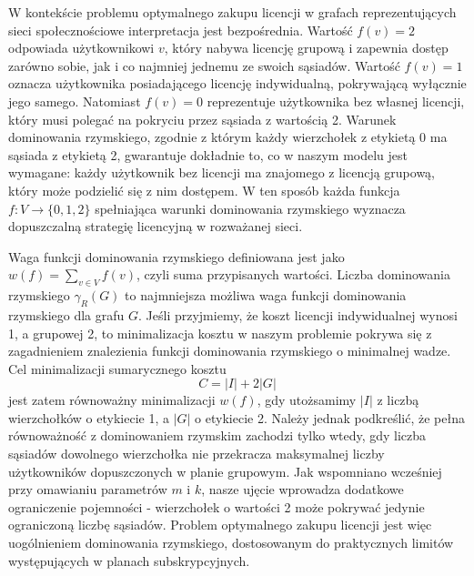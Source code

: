 W kontekście problemu optymalnego zakupu licencji w grafach reprezentujących sieci społecznościowe interpretacja jest bezpośrednia. Wartość $f(v)=2$ odpowiada użytkownikowi $v$, który nabywa licencję grupową i zapewnia dostęp zarówno sobie, jak i co najmniej jednemu ze swoich sąsiadów. Wartość $f(v)=1$ oznacza użytkownika posiadającego licencję indywidualną, pokrywającą wyłącznie jego samego. Natomiast $f(v)=0$ reprezentuje użytkownika bez własnej licencji, który musi polegać na pokryciu przez sąsiada z wartością 2. Warunek dominowania rzymskiego, zgodnie z którym każdy wierzchołek z etykietą 0 ma sąsiada z etykietą 2, gwarantuje dokładnie to, co w naszym modelu jest wymagane: każdy użytkownik bez licencji ma znajomego z licencją grupową, który może podzielić się z nim dostępem. W ten sposób każda funkcja $f:V \to \{0,1,2\}$ spełniająca warunki dominowania rzymskiego wyznacza dopuszczalną strategię licencyjną w rozważanej sieci.


Waga funkcji dominowania rzymskiego definiowana jest jako $w(f) = \sum_{v \in V} f(v)$, czyli suma przypisanych wartości. Liczba dominowania rzymskiego $\gamma_R(G)$ to najmniejsza możliwa waga funkcji dominowania rzymskiego dla grafu $G$. Jeśli przyjmiemy, że koszt licencji indywidualnej wynosi 1, a grupowej 2, to minimalizacja kosztu w naszym problemie pokrywa się z zagadnieniem znalezienia funkcji dominowania rzymskiego o minimalnej wadze. Cel minimalizacji sumarycznego kosztu
\[
C = |I| + 2|G|
\]
jest zatem równoważny minimalizacji $w(f)$, gdy utożsamimy $|I|$ z liczbą wierzchołków o etykiecie 1, a $|G|$ o etykiecie 2. Należy jednak podkreślić, że pełna równoważność z dominowaniem rzymskim zachodzi tylko wtedy, gdy liczba sąsiadów dowolnego wierzchołka nie przekracza maksymalnej liczby użytkowników dopuszczonych w planie grupowym. Jak wspomniano wcześniej przy omawianiu parametrów $m$ i $k$, nasze ujęcie wprowadza dodatkowe ograniczenie pojemności - wierzchołek o wartości 2 może pokrywać jedynie ograniczoną liczbę sąsiadów. Problem optymalnego zakupu licencji jest więc uogólnieniem dominowania rzymskiego, dostosowanym do praktycznych limitów występujących w planach subskrypcyjnych.

